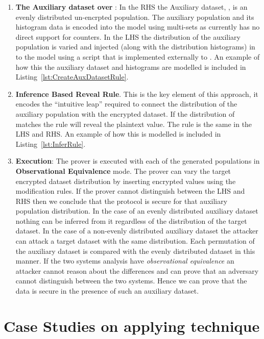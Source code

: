 \documentclass[journal]{IEEEtran}
\begin{document}
\begin{enumerate}[label=(\Alph*)]
\item \textbf{The Auxiliary dataset \aux{} over \auxSpace}:
In the RHS the Auxiliary dataset, \auxsecure{}, is an evenly distributed un-encrpted population.  The auxiliary population and its histogram data is encoded into the model using \tamarin{} multi-sets as \tamarin{} currently has no direct support for counters. 
In the LHS the distribution of the auxiliary population is varied and injected (along with the distribution histograms) in to the model using a script that is implemented externally to \tamarin{}.
An example of how this the auxiliary dataset and histograms are modelled is included in Listing~\ref{lst:CreateAuxDatasetRule}.
\item\textbf{Inference Based Reveal Rule}. This is the key element of this approach, it encodes the ``intuitive leap'' required to connect the distribution of the auxiliary population with the encrypted dataset. If the distribution of \aux{} matches \enc{} the rule will reveal the plaintext value. The rule is the same in the LHS and RHS. An example of how this is modelled is included in Listing~\ref{lst:InferRule}.
\item \textbf{Execution}:
The \tamarin{} prover is executed with each of the generated \aux{} populations in \textbf{Observational Equivalence} mode. The prover can vary the target encrypted dataset distribution by inserting encrypted values using the modification rules. If the prover cannot distinguish between the LHS and RHS then we conclude that the protocol is secure for that auxiliary population distribution.  In the case of an evenly distributed auxiliary dataset nothing can be inferred from it regardless of the distribution of the target dataset. In the case of a non-evenly distributed auxiliary dataset the attacker can attack a target dataset with the same distribution. Each permutation of the auxiliary dataset is compared with the evenly distributed dataset in this manner. If the two systems analysis have \textit{observational equivalence} an attacker cannot reason about the differences and \tamarin{} can prove that an adversary cannot distinguish between the two systems. Hence we can prove that the data is secure in the presence of such an auxiliary dataset.

\end{enumerate}


 
\section{Case Studies on applying technique}
\end{document}
